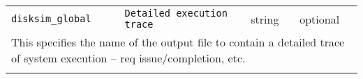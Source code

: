 \noindent 
\begin{tabular}{|p{\lpmodwidth}|p{\lpnamewidth}|p{0.5in}|p{0.5in}|}
\cline{1-4}
\texttt{disksim\_global} & \texttt{Detailed execution trace} & string & optional \\ 
\cline{1-4}
\multicolumn{4}{|p{6in}|}{
This specifies the name of the output file to contain a detailed trace
of system execution -- req issue/completion, etc.
}\\ 
\cline{1-4}
\multicolumn{4}{p{5in}}{}\\
\end{tabular}\\ 

